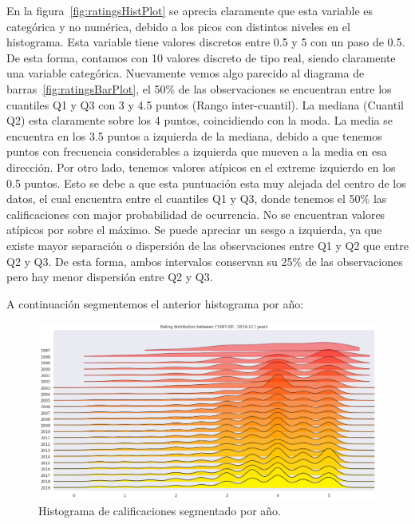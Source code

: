 \documentclass[11pt,a4paper,twoside]{thesis}
\begin{document}
En la figura~\ref{fig:ratingsHistPlot} se aprecia claramente que esta variable
es categórica y no numérica, debido a los picos con distintos niveles en el
histograma. Esta variable tiene valores discretos entre 0.5 y 5 con un paso de
0.5. De esta forma, contamos con 10 valores discreto de tipo real, siendo
claramente una variable categórica. Nuevamente vemos algo parecido al diagrama
de barras~\ref{fig:ratingsBarPlot}, el 50\% de las observaciones se encuentran
entre los cuantiles Q1 y Q3 con 3 y 4.5 puntos (Rango inter-cuantil). La
mediana (Cuantil Q2) esta claramente sobre los 4 puntos, coincidiendo con la
moda. La media se encuentra en los 3.5 puntos a izquierda de la mediana, debido
a que tenemos puntos con frecuencia considerables a izquierda que mueven a la
media en esa dirección. Por otro lado, tenemos valores atípicos en el extreme
izquierdo en los 0.5 puntos. Esto se debe a que esta puntuación esta muy
alejada del centro de los datos, el cual encuentra entre el cuantiles Q1 y Q3,
donde tenemos el 50\% las calificaciones con major probabilidad de ocurrencia.
No se encuentran valores atípicos por sobre el máximo. Se puede apreciar un
sesgo a izquierda, ya que existe mayor separación o dispersión de las
observaciones entre Q1 y Q2 que entre Q2 y Q3. De esta forma, ambos intervalos
conservan su 25\% de las observaciones pero hay menor dispersión entre Q2 y Q3.

\clearpage
A continuación segmentemos el anterior histograma por año:

\begin{figure}[h!]
	\centering
	\includegraphics[width=15cm]{./images/rating-by-year.png}
	\caption{Histograma de calificaciones segmentado por año.}
	\label{fig:ratingsYearHistPlot}
\end{figure}
\end{document}
